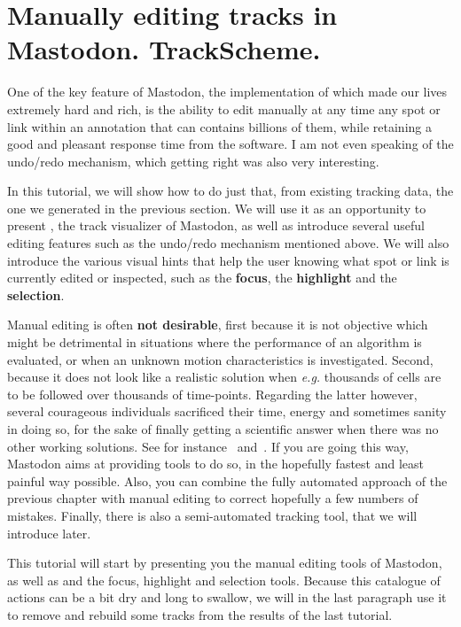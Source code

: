 \section{Manually editing tracks in Mastodon. TrackScheme.}

One of the key feature of Mastodon, the implementation of which made our lives extremely hard and rich, is the ability to edit manually at any time any spot or link within an annotation that can contains billions of them, while retaining a good and pleasant response time from the software.
I am not even speaking of the undo/redo mechanism, which getting right was also very interesting. 

In this tutorial, we will show how to do just that, from existing tracking data, the one we generated in the previous section. 
We will use it as an opportunity to present \TrackScheme, the track visualizer of Mastodon, as well as introduce several useful editing features such as the undo/redo mechanism mentioned above.
We will also introduce the various visual hints that help the user knowing what spot or link is currently edited or inspected, such as the \textbf{focus}, the \textbf{highlight} and the \textbf{selection}.

Manual editing is often \textbf{not desirable}, first because it is not objective which might be detrimental in situations where the performance of an algorithm is evaluated, or when an unknown motion characteristics is investigated. 
Second, because it does not look like a realistic solution when \textit{e.g.} thousands of cells are to be followed over thousands of time-points.
Regarding the latter however, several courageous individuals sacrificed their time, energy and sometimes sanity in doing so, for the sake of finally getting a scientific answer when there was no other working solutions. 
See for instance~\cite{MaMuT} and~\cite{McDole2018}.
If you are going this way, Mastodon aims at providing tools to do so, in the hopefully fastest and least painful way possible. 
Also, you can combine the fully automated approach of the previous chapter with manual editing to correct hopefully a few numbers of mistakes.
Finally, there is also a semi-automated tracking tool, that we will introduce later.

This tutorial will start by presenting you the manual editing tools of Mastodon, as well as \TrackScheme and the focus, highlight and selection tools.
Because this catalogue of actions can be a bit dry and long to swallow, we will in the last paragraph use it to remove and rebuild some tracks from the results of the last tutorial.



